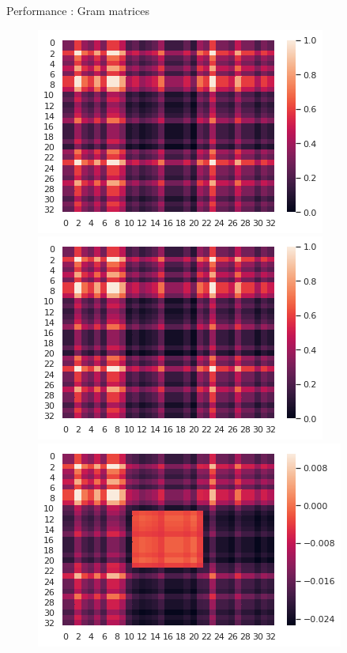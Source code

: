 \documentclass[compress]{beamer}
\begin{document}
\begin{frame}{Performance : Gram matrices}
\begin{figure}[!htb]
	\begin{multicols}{3}
		\includegraphics[width=\linewidth]{data/gram/gram3.png}\par
		\includegraphics[width=\linewidth]{data/gram/gram4.png}\par
		\includegraphics[width=\linewidth]{data/gram/gram5.png}\par

\end{multicols}
\end{figure}
\end{frame}
\end{document}
